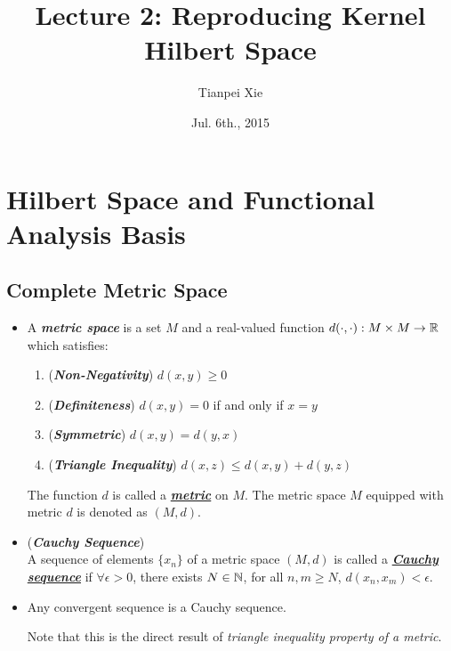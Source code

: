 \documentclass[11pt]{article}
\begin{document}
\title{Lecture 2: Reproducing Kernel Hilbert Space}
\author{ Tianpei Xie}
\date{ Jul. 6th., 2015 }
\maketitle
\tableofcontents
\newpage
\section{Hilbert Space and Functional Analysis Basis}
\subsection{Complete Metric Space}
\begin{itemize}
\item \begin{definition}
A \emph{\textbf{metric space}} is a set $M$ and a real-valued function $d(\cdot , \cdot): M \times M \rightarrow {\mathbb R}$  which satisfies:
\begin{enumerate}
\item (\emph{\textbf{Non-Negativity}}) $d(x, y) \ge 0$
\item (\emph{\textbf{Definiteness}}) $d(x, y) = 0$ if and only if $x = y$
\item (\emph{\textbf{Symmetric}}) $d(x, y) = d(y, x)$
\item (\emph{\textbf{Triangle Inequality}}) $d(x, z) \le d(x, y) + d(y, z)$
\end{enumerate} The function $d$ is called a \underline{\emph{\textbf{metric}}} on $M$. The metric space $M$ equipped with metric $d$ is denoted as $(M, d)$.
\end{definition}

\item \begin{definition} (\emph{\textbf{Cauchy Sequence}})\\
A sequence of elements $\{x_n\}$ of a metric space $(M, d)$ is called a \underline{\emph{\textbf{Cauchy sequence}}} if $\forall \epsilon >0$, there exists $N \in {\mathbb N}$, for all $n, m \ge N$, $d(x_n, x_m ) < \epsilon$.
\end{definition}

\item \begin{proposition}
Any convergent sequence is a Cauchy sequence.
\end{proposition} Note that this is the direct result of \emph{triangle inequality property of a metric}.


\end{itemize}
\end{document}

